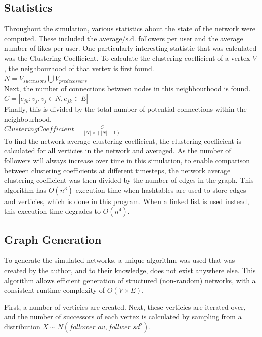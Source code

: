 \documentclass{article}
\begin{document}
\subsection{Statistics}
Throughout the simulation, various statistics about the state of the network were
computed. These included the average/s.d. followers per user and the average number of likes
per user.
One particularly interesting statistic that was calculated was the Clustering Coefficient.
To calculate the clustering coefficient of a vertex $V$, the neighbourhood of that
vertex is first found.\\
$N = V_{successors} \bigcup V_{predecessors}$\\
Next, the number of connections between nodes in this neighbourhood is found.\\
$C = |{e_{jk} : v_j, v_j \in N, e_{jk} \in E}|$\\
Finally, this is divided by the total number of potential connections within the neighbourhood.\\
$\mathit{Clustering Coefficient} = \frac{C}{|N| \times (|N| - 1)}$\\
To find the network average clustering coefficient, the clustering coefficient
is calculated for all verticies in the network and averaged.
As the number of followers will always increase over time in this simulation,
to enable comparison between clustering coefficients at different timesteps,
the network average clustering coefficient was then divided by the number
of edges in the graph.
This algorithm has $O\left(n^3\right)$ execution time when hashtables are used to store
edges and verticies, which is done in this program.
When a linked list is used instead, this execution time degrades to $O\left(n^4\right)$.

\subsection{Graph Generation}

To generate the simulated networks, a unique algorithm was used
that was created by the author, and to their knowledge, does not exist anywhere else.
This algorithm allows efficient generation of structured (non-random) networks,
with a consistent runtime complexity of $O\left(V \times E\right)$.

First, a number of verticies are created.
Next, these verticies are iterated over, and the number of successors of each
vertex is calculated by sampling from a distribution $X \sim N\left(follower\_av, follwer\_sd^2\right)$.
\end{document}
